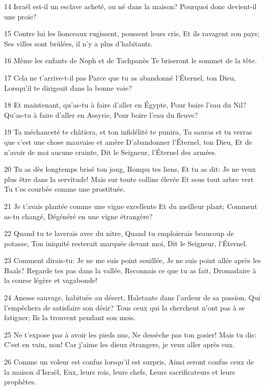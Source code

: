 \par 14 Israël est-il un esclave acheté, ou né dans la maison? Pourquoi donc devient-il une proie?
\par 15 Contre lui les lionceaux rugissent, poussent leurs cris, Et ils ravagent son pays; Ses villes sont brûlées, il n'y a plus d'habitants.
\par 16 Même les enfants de Noph et de Tachpanès Te briseront le sommet de la tête.
\par 17 Cela ne t'arrive-t-il pas Parce que tu as abandonné l'Éternel, ton Dieu, Lorsqu'il te dirigeait dans la bonne voie?
\par 18 Et maintenant, qu'as-tu à faire d'aller en Égypte, Pour boire l'eau du Nil? Qu'as-tu à faire d'aller en Assyrie, Pour boire l'eau du fleuve?
\par 19 Ta méchanceté te châtiera, et ton infidélité te punira, Tu sauras et tu verras que c'est une chose mauvaise et amère D'abandonner l'Éternel, ton Dieu, Et de n'avoir de moi aucune crainte, Dit le Seigneur, l'Éternel des armées.
\par 20 Tu as dès longtemps brisé ton joug, Rompu tes liens, Et tu as dit: Je ne veux plus être dans la servitude! Mais sur toute colline élevée Et sous tout arbre vert Tu t'es courbée comme une prostituée.
\par 21 Je t'avais plantée comme une vigne excellente Et du meilleur plant; Comment as-tu changé, Dégénéré en une vigne étrangère?
\par 22 Quand tu te laverais avec du nitre, Quand tu emploierais beaucoup de potasse, Ton iniquité resterait marquée devant moi, Dit le Seigneur, l'Éternel.
\par 23 Comment dirais-tu: Je ne me suis point souillée, Je ne suis point allée après les Baals? Regarde tes pas dans la vallée, Reconnais ce que tu as fait, Dromadaire à la course légère et vagabonde!
\par 24 Anesse sauvage, habituée au désert, Haletante dans l'ardeur de sa passion, Qui l'empêchera de satisfaire son désir? Tous ceux qui la cherchent n'ont pas à se fatiguer; Ils la trouvent pendant son mois.
\par 25 Ne t'expose pas à avoir les pieds nus, Ne dessèche pas ton gosier! Mais tu dis: C'est en vain, non! Car j'aime les dieux étrangers, je veux aller après eux.
\par 26 Comme un voleur est confus lorsqu'il est surpris, Ainsi seront confus ceux de la maison d'Israël, Eux, leurs rois, leurs chefs, Leurs sacrificateurs et leurs prophètes.
